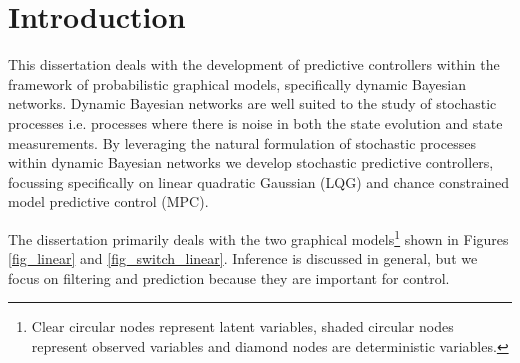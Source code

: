 \chapter{Introduction}
This dissertation deals with the development of predictive controllers within the framework of probabilistic graphical models, specifically dynamic Bayesian networks. Dynamic Bayesian networks are well suited to the study of stochastic processes i.e. processes where there is noise in both the state evolution and state measurements. By leveraging the natural formulation of stochastic processes within dynamic Bayesian networks we develop stochastic predictive controllers, focussing specifically on linear quadratic Gaussian (LQG) and chance constrained model predictive control (MPC).

The dissertation primarily deals with the two graphical models\footnote{Clear circular nodes represent latent variables, shaded circular nodes represent observed variables and diamond nodes are deterministic variables.} shown in Figures \ref{fig_linear} and \ref{fig_switch_linear}. Inference is discussed in general, but we focus on filtering and prediction because they are important for control. 
